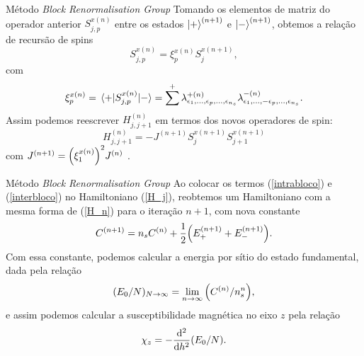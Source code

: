 \documentclass[brazil]{beamer}
\begin{document}
\begin{frame}{Método \textit{Block Renormalisation Group}}
    Tomando os elementos de matriz do operador anterior \( S_{j, p}^{x (n)} \) entre os estados \( \ket{+}^{(n + 1)} \) e \( \ket{-}^{(n + 1)} \), obtemos a relação de recursão de spins
    \begin{equation}
        S_{j, p}^{x (n)} = \xi_p^{x(n)} S_j^{x(n + 1)} ,
    \end{equation}
    com
    \begin{equation}
        \xi_p^{x(n)} = \mel{+}{S_{j, p}^{x (n)}}{-} = \sum^+ \lambda_{\epsilon_1, \dotsc, \epsilon_p, \dotsc, \epsilon_{n_s}}^{+ (n)} \lambda_{\epsilon_1, \dotsc, - \epsilon_p, \dotsc, \epsilon_{n_s}}^{- (n)}.
    \end{equation}
    Assim podemos reescrever \( H_{j, j + 1}^{(n)} \) em termos dos novos operadores de spin:
    \begin{equation}
        H_{j, j + 1}^{(n)} = - J^{(n + 1)} S_j^{x(n + 1)} S_{j + 1}^{x(n + 1)} \label{interbloco}
    \end{equation}
    com \( J^{(n + 1)} = \qty( \xi_1^{x(n)} )^2 J^{(n)} \) .
\end{frame}

\begin{frame}{Método \textit{Block Renormalisation Group}}
    Ao colocar os termos (\ref{intrabloco}) e (\ref{interbloco}) no Hamiltoniano (\ref{H_j}), reobtemos um Hamiltoniano com a mesma forma de (\ref{H_n}) para o iteração \( n + 1 \), com nova constante
    \begin{equation}
        C^{(n + 1)} = n_s C^{(n)} + \frac{1}{2} \qty( E_+^{(n + 1)} + E_-^{(n + 1)} ) .
    \end{equation}
    Com essa constante, podemos calcular a energia por sítio do estado fundamental, dada pela relação
    \begin{equation}
        (E_0 / N)_{N \to \infty} = \lim_{n \to \infty} \qty(C^{(n)} / n_s^n) ,
    \end{equation}
    e assim podemos calcular a susceptibilidade magnética no eixo \( z \) pela relação
    \begin{equation}
        \chi_z = - \dv[2]{h} (E_0 / N) .
    \end{equation}
\end{frame}
\end{document}
